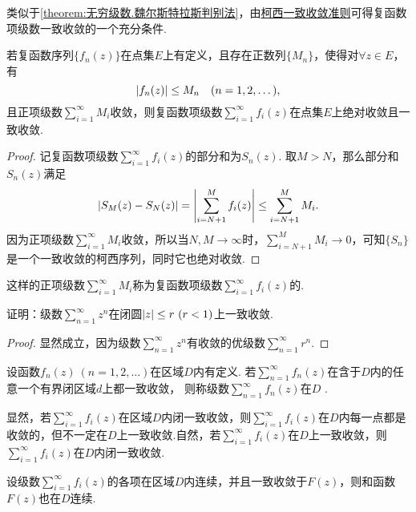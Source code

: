 类似于\cref{theorem:无穷级数.魏尔斯特拉斯判别法}，由\hyperref[theorem:无穷级数.柯西一致收敛准则]{柯西一致收敛准则}可得复函数项级数一致收敛的一个充分条件.
\begin{corollary}\label{theorem:无穷级数.优级数准则}
若复函数序列\(\{f_n(z)\}\)在点集\(E\)上有定义，且存在正数列\(\{M_n\}\)，使得对\(\forall z \in E\)，有\[
\abs{f_n(z)} \leq M_n
\quad(n=1,2,\dotsc),
\]且正项级数\(\sum\limits_{i=1}^\infty M_i\)收敛，则复函数项级数\(\sum\limits_{i=1}^\infty f_i(z)\)在点集\(E\)上绝对收敛且一致收敛.
\begin{proof}
记复函数项级数\(\sum\limits_{i=1}^\infty f_i(z)\)的部分和为\(S_n(z)\).
取\(M > N\)，那么部分和\(S_n(z)\)满足\[
\abs{S_M(z) - S_N(z)}
= \abs{\sum\limits_{i=N+1}^M f_i(z)}
\leq \sum\limits_{i=N+1}^M M_i.
\]因为正项级数\(\sum\limits_{i=1}^\infty M_i\)收敛，所以当\(N,M \to \infty\)时，\(\sum\limits_{i=N+1}^M M_i \to 0\)，可知\(\{S_n\}\)是一个一致收敛的柯西序列，同时它也绝对收敛.
\end{proof}
\end{corollary}
这样的正项级数\(\sum\limits_{i=1}^\infty M_i\)称为复函数项级数\(\sum\limits_{i=1}^\infty f_i(z)\)的.

\begin{example}
证明：级数\(\sum\limits_{n=1}^\infty z^n\)在闭圆\(\abs{z} \leq r\ (r<1)\)上一致收敛.
\begin{proof}
显然成立，因为级数\(\sum\limits_{n=1}^\infty z^n\)有收敛的优级数\(\sum\limits_{n=1}^\infty r^n\).
\end{proof}
\end{example}

\begin{definition}
设函数\(f_n(z)\ (n=1,2,\dots)\)在区域\(D\)内有定义.
若\(\sum\limits_{n=1}^\infty f_n(z)\)在含于\(D\)内的任意一个有界闭区域\(d\)上都一致收敛，
则称级数\(\sum\limits_{n=1}^\infty f_n(z)\)在\(D\) .
\end{definition}
显然，若\(\sum\limits_{i=1}^\infty f_i(z)\)在区域\(D\)内闭一致收敛，则\(\sum\limits_{i=1}^\infty f_i(z)\)在\(D\)内每一点都是收敛的，但不一定在\(D\)上一致收敛.自然，若\(\sum\limits_{i=1}^\infty f_i(z)\)在\(D\)上一致收敛，则\(\sum\limits_{i=1}^\infty f_i(z)\)在\(D\)内闭一致收敛.

\begin{theorem}\label{theorem:解析函数的级数表示.一致收敛级数的基本性质1}
设级数\(\sum\limits_{i=1}^\infty f_i(z)\)的各项在区域\(D\)内连续，并且一致收敛于\(F(z)\)，则和函数\(F(z)\)也在\(D\)连续.
\end{theorem}

